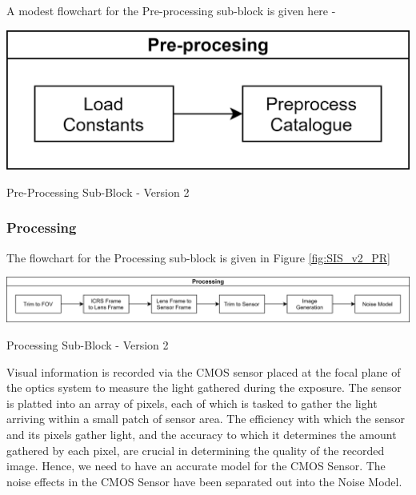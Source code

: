 \documentclass[../../main.tex]{subfiles}
\begin{document}
A modest flowchart for the Pre-processing sub-block is given here -

\begin{Flowchart}[h!]
    \centering
    \includegraphics[scale=0.09]{Figures/Model/Pre-processing.png}
    \caption{Pre-Processing Sub-Block - Version 2}
    \label{fig:SIS_v2_PP}
\end{Flowchart}


\subsubsection{Processing}

The flowchart for the Processing sub-block is given in Figure \ref{fig:SIS_v2_PR}

\begin{Flowchart}[h!]
    \centering
    \includegraphics[scale=0.09]{Figures/Model/Processing.png}
    \caption{Processing Sub-Block - Version 2}
    \label{fig:SIS_v2_PR}
\end{Flowchart}

Visual information is recorded via the CMOS sensor placed at the focal plane of the optics system to measure the light gathered during the exposure. The sensor is platted into an array of pixels, each of which is tasked to gather the light arriving within a small patch of sensor area. The efficiency with which the sensor and its pixels gather light, and the accuracy to which it determines the amount gathered by each pixel, are crucial in determining the quality of the recorded image. \cite{DSLRs} Hence, we need to have an accurate model for the CMOS Sensor. The noise effects in the CMOS Sensor have been separated out into the Noise Model.
\end{document}
